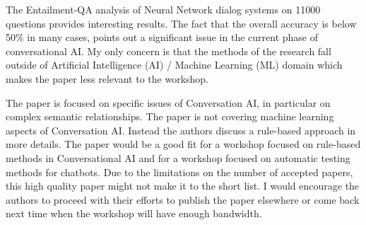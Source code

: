 The Entailment-QA analysis of Neural Network dialog systems on 11000 questions provides interesting results. The fact that the overall accuracy is below 50$\%$ in many cases, points out a significant issue in the current phase of conversational AI. My only concern is that the methods of the research fall outside of Artificial Intelligence (AI) / Machine Learning (ML) domain which makes the paper less relevant to the workshop.

The paper is focused on specific issues of Conversation AI, in particular on complex semantic relationships. The paper is not covering machine learning aspects of Conversation AI. Instead the authors discuss a rule-based approach in more details. The paper would be a good fit for a workshop focused on rule-based methods in Conversational AI and for a workshop focused on automatic testing methods for chatbots. Due to the limitations on the number of accepted papers, this high quality paper might not make it to the short list. I would encourage the authors to proceed with their efforts to publish the paper elsewhere or come back next time when the workshop will have enough bandwidth.